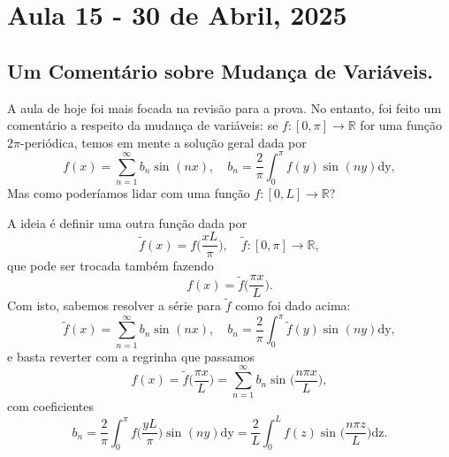 \documentclass[../pde_notes.tex]{subfiles}
\begin{document}
\section{Aula 15 - 30 de Abril, 2025}
\subsection{Um Comentário sobre Mudança de Variáveis.}
A aula de hoje foi mais focada na revisão para a prova. No entanto, foi feito um comentário a respeito da mudança de variáveis: se \(f:[0, \pi ]\rightarrow \mathbb{R}\) for uma função \(2\pi \)-periódica, temos em mente a solução geral dada por
\[
	f(x) =\sum\limits_{n=1}^{\infty}b_{n}\sin^{}{(nx)},\quad b_{n}=\frac{2}{\pi }\int_{0}^{\pi }f(y)\sin^{}{(ny)} \mathrm{dy},
\]
Mas como poderíamos lidar com uma função \(f:[0, L]\rightarrow \mathbb{R}\)?

A ideia é definir uma outra função dada por
\[
	\tilde{f}(x) = f \biggl(\frac{xL}{\pi }\biggr), \quad  \tilde{f}:[0, \pi ]\rightarrow \mathbb{R},
\]
que pode ser trocada também fazendo
\[
	f(x) = \tilde{f}\biggl(\frac{\pi x}{L}\biggr).
\]
Com isto, sabemos resolver a série para \(\tilde{f}\) como foi dado acima:
\[
	\tilde{f}(x) =\sum\limits_{n=1}^{\infty}b_{n}\sin^{}{(nx)},\quad b_{n}=\frac{2}{\pi }\int_{0}^{\pi }\tilde{f}(y)\sin^{}{(ny)} \mathrm{dy},
\]
e basta reverter com a regrinha que passamos
\[
	f(x) = \tilde{f}\biggl(\frac{\pi x}{L}\biggr) = \sum\limits_{n=1}^{\infty}b_{n}\sin^{}{\biggl(\frac{n\pi x}{L}\biggr)},
\]
com coeficientes
\[
	b_{n} = \frac{2}{\pi }\int_{0}^{\pi }f \biggl(\frac{yL}{\pi }\biggr)\sin^{}{(ny)} \mathrm{dy} = \frac{2}{L}\int_{0}^{L}f(z)\sin^{}{\biggl(\frac{n\pi z}{L}\biggr)} \mathrm{dz}.
\]
\end{document}
